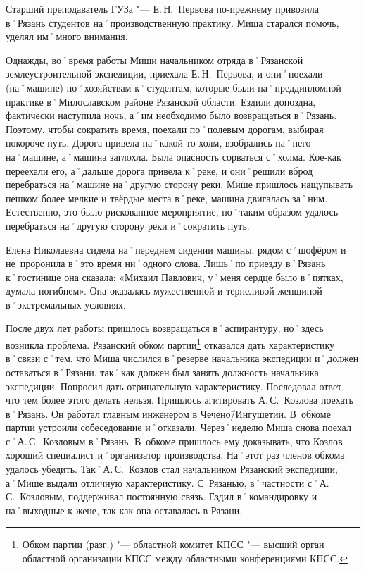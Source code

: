 Старший преподаватель ГУЗа "--- Е.\,Н.~Первова по-прежнему привозила в˚Рязань студентов на˚производственную практику. Миша старался помочь, уделял им˚много внимания.

Однажды, во˚время работы Миши начальником отряда в˚Рязанской землеустроительной экспедиции, приехала Е.\,Н.~Первова, и они˚поехали (на˚машине) по˚хозяйствам к˚студентам, которые были на˚преддипломной практике в˚Милославском районе Рязанской области. Ездили допоздна, фактически наступила ночь, а˚им необходимо было возвращаться в˚Рязань. Поэтому, чтобы сократить время, поехали по˚полевым дорогам, выбирая покороче путь. Дорога привела на˚какой-то холм, взобрались на˚него на˚машине, а˚машина заглохла. Была опасность сорваться с˚холма. Кое-как переехали его, а˚дальше дорога привела к˚реке, и они˚решили вброд перебраться на˚машине на˚другую сторону реки. Мише пришлось нащупывать пешком более мелкие и твёрдые места в˚реке, машина двигалась за˚ним. Естественно, это было рискованное мероприятие, но˚таким образом удалось перебраться на˚другую сторону реки и˚сократить путь. 

Елена Николаевна сидела на˚переднем сидении машины, рядом с˚шофёром и не~проронила в˚это время ни˚одного слова. Лишь˚по приезду в˚Рязань к˚гостинице она сказала: «Михаил Павлович, у˚меня сердце было в˚пятках, думала погибнем». Она оказалась мужественной и терпеливой женщиной в˚экстремальных условиях.

После двух лет работы пришлось возвращаться в˚аспирантуру, но˚здесь возникла проблема. Рязанский обком партии\footnote{Обком партии (разг.) "--- областной комитет КПСС "--- высший орган областной организации КПСС между областными конференциями КПСС.} отказался дать характеристику в˚связи с˚тем, что Миша числился в˚резерве начальника экспедиции и˚должен оставаться в˚Рязани, так˚как должен был занять должность начальника экспедиции. Попросил дать отрицательную характеристику. Последовал ответ, что тем более этого делать нельзя. Пришлось агитировать А.\,С.~Козлова поехать в˚Рязань. Он работал главным инженером в Чечено\=/Ингушетии. В~обкоме партии устроили собеседование и˚отказали. Через˚неделю Миша снова поехал с˚А.\,С.~Козловым в˚Рязань. В~обкоме пришлось ему доказывать, что Козлов хороший специалист и˚организатор производства. На˚этот раз членов обкома удалось убедить. Так˚А.\,С.~Козлов стал начальником Рязанский экспедиции, а˚Мише выдали отличную характеристику. С~Рязанью, в˚частности с˚А.\,С.~Козловым, поддерживал постоянную связь. Ездил в˚командировку и на˚выходные к жене, так как она оставалась в Рязани.